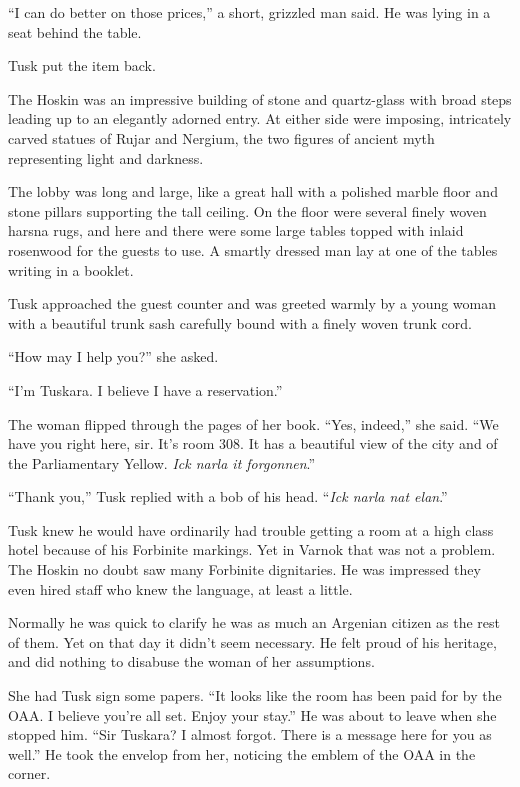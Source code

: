 ``I can do better on those prices,'' a short, grizzled man said. He was lying in a seat behind
the table.

Tusk put the item back.

The Hoskin was an impressive building of stone and quartz-glass with broad steps leading up to
an elegantly adorned entry. At either side were imposing, intricately carved statues of Rujar
and Nergium, the two figures of ancient myth representing light and darkness.

The lobby was long and large, like a great hall with a polished marble floor and stone pillars
supporting the tall ceiling. On the floor were several finely woven harsna rugs, and here and
there were some large tables topped with inlaid rosenwood for the guests to use. A smartly
dressed man lay at one of the tables writing in a booklet.

Tusk approached the guest counter and was greeted warmly by a young woman with a beautiful trunk
sash carefully bound with a finely woven trunk cord.

``How may I help you?'' she asked.

``I'm Tuskara. I believe I have a reservation.''

The woman flipped through the pages of her book. ``Yes, indeed,'' she said. ``We have you right
here, sir. It's room 308. It has a beautiful view of the city and of the Parliamentary Yellow.
\textit{Ick narla it forgonnen}.''

``Thank you,'' Tusk replied with a bob of his head. ``\textit{Ick narla nat elan}.''

Tusk knew he would have ordinarily had trouble getting a room at a high class hotel because of
his Forbinite markings. Yet in Varnok that was not a problem. The Hoskin no doubt saw many
Forbinite dignitaries. He was impressed they even hired staff who knew the language, at least a
little.

Normally he was quick to clarify he was as much an Argenian citizen as the rest of them. Yet on
that day it didn't seem necessary. He felt proud of his heritage, and did nothing to disabuse
the woman of her assumptions.

She had Tusk sign some papers. ``It looks like the room has been paid for by the OAA. I believe
you're all set. Enjoy your stay.'' He was about to leave when she stopped him. ``Sir Tuskara? I
almost forgot. There is a message here for you as well.'' He took the envelop from her, noticing
the emblem of the OAA in the corner.


